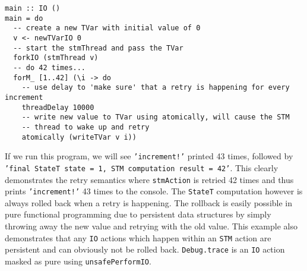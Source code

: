 \begin{footnotesize}
\begin{verbatim}
main :: IO ()
main = do
  -- create a new TVar with initial value of 0
  v <- newTVarIO 0 
  -- start the stmThread and pass the TVar
  forkIO (stmThread v)
  -- do 42 times...
  forM_ [1..42] (\i -> do
    -- use delay to 'make sure' that a retry is happening for every increment
    threadDelay 10000
    -- write new value to TVar using atomically, will cause the STM
    -- thread to wake up and retry
    atomically (writeTVar v i))
\end{verbatim}
\end{footnotesize}

If we run this program, we will see \texttt{'increment!'} printed 43 times, followed by \texttt{'final StateT state = 1, STM computation result = 42'}. This clearly demonstrates the retry semantics where \texttt{stmAction} is retried 42 times and thus prints \texttt{'increment!'} 43 times to the console. The \texttt{StateT} computation however is always rolled back when a retry is happening. The rollback is easily possible in pure functional programming due to persistent data structures by simply throwing away the new value and retrying with the old value. This example also demonstrates that any \texttt{IO} actions which happen within an \texttt{STM} action are persistent and can obviously not be rolled back. \texttt{Debug.trace} is an \texttt{IO} action masked as pure using \texttt{unsafePerformIO}.